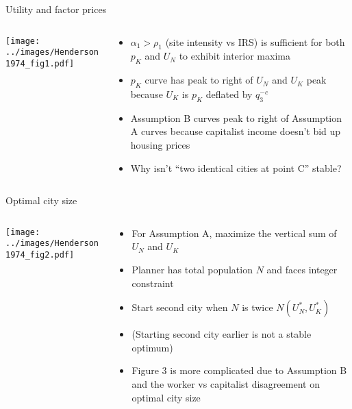 \documentclass[10pt,notes=hide]{beamer}
\begin{document}
\begin{frame}{Utility and factor prices}
\begin{columns}
\begin{column}{.48\textwidth}
\texttt{[image: ../images/Henderson1974\_fig1.pdf]}
\end{column}
\begin{column}{.5\textwidth}
\begin{itemize}
\item $\alpha_1 > \rho_1$ (site intensity vs IRS) is sufficient for both $p_K$ and $U_N$ to exhibit interior maxima
\item $p_K$ curve has peak to right of $U_N$ and $U_K$ peak because $U_K$ is $p_K$ deflated by $q_3^{-c}$
\item Assumption B curves peak to right of Assumption A curves because capitalist income doesn't bid up housing prices
\item Why isn't ``two identical cities at point C'' stable?
\end{itemize}
\end{column}
\end{columns}
\end{frame}
\begin{frame}{Optimal city size}
\begin{columns}
\begin{column}{.48\textwidth}
\texttt{[image: ../images/Henderson1974\_fig2.pdf]}
\end{column}
\begin{column}{.5\textwidth}
\begin{itemize}
\item For Assumption A, maximize the vertical sum of $U_N$ and $U_K$
\item Planner has total population $N$ and faces integer constraint
\item Start second city when $N$ is twice $N(U_N^*,U_K^*)$
\item[] (Starting second city earlier is not a stable optimum)
\item Figure 3 is more complicated due to Assumption B and the worker vs capitalist disagreement on optimal city size
\end{itemize}
\end{column}
\end{columns}
\end{frame}
\end{document}

